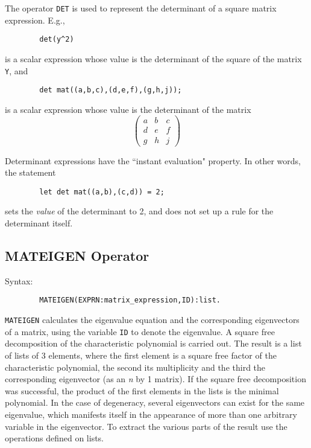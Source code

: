 The operator {\tt DET} is used to represent the determinant of a square
matrix expression.  E.g.,
\begin{verbatim}
        det(y^2)
\end{verbatim}
is a scalar expression whose value is the determinant of the square of the
matrix {\tt Y}, and
\begin{verbatim}
        det mat((a,b,c),(d,e,f),(g,h,j));
\end{verbatim}
is a scalar expression whose value is the determinant of the matrix
\[ \left( \begin{array}{lcr} a & b & c \\ d & e & f \\ g & h & j
\end{array} \right) \]

Determinant expressions have the ``instant evaluation" property.
  In other words, the statement
\begin{verbatim}
        let det mat((a,b),(c,d)) = 2;
\end{verbatim}
sets the {\em value} of the determinant to 2, and does not set up a rule
for the determinant itself.

\subsection{MATEIGEN Operator} 
Syntax:
\begin{verbatim}
        MATEIGEN(EXPRN:matrix_expression,ID):list.
\end{verbatim}

{\tt MATEIGEN} calculates the eigenvalue equation and the corresponding
eigenvectors of a matrix, using the variable {\tt ID} to denote the
eigenvalue.  A square free decomposition of the characteristic polynomial
is carried out.  The result is a list of lists of 3 elements, where the
first element is a square free factor of the characteristic polynomial,
the second its multiplicity and the third the corresponding eigenvector
(as an {\em n} by 1 matrix).  If the square free decomposition was
successful, the product of the first elements in the lists is the minimal
polynomial.  In the case of degeneracy, several eigenvectors can exist for
the same eigenvalue, which manifests itself in the appearance of more than
one arbitrary variable in the eigenvector.  To extract the various parts
of the result use the operations defined on lists.

